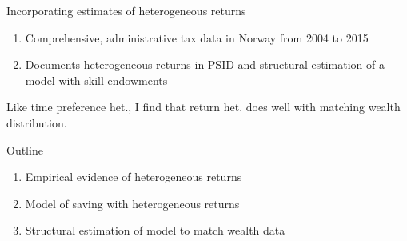 \documentclass{beamer}
\begin{document}
\begin{frame}{Incorporating estimates of heterogeneous returns}

   \small
   \begin{enumerate}
    \item Comprehensive, administrative tax data in Norway from 2004 to 2015  \parencite{aflgdmlp20}
    \item Documents heterogeneous returns in PSID and structural estimation of a model with skill endowments \parencite{Daminato2024}
    \end{enumerate}
    
    Like time preference het., I find that return het. does well with matching wealth distribution.

\end{frame}

\begin{frame}{Outline}
\begin{enumerate}
\item Empirical evidence of heterogeneous returns
\item Model of saving with heterogeneous returns
\item Structural estimation of model to match wealth data
\end{enumerate}
\end{frame}
\end{document}
